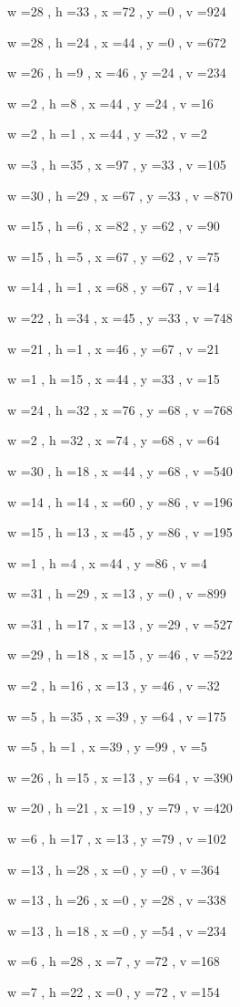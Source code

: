 \documentclass[11pt]{article}
\begin{document}
w =28 , h =33 , x =72 , y =0 , v =924
\par
w =28 , h =24 , x =44 , y =0 , v =672
\par
w =26 , h =9 , x =46 , y =24 , v =234
\par
w =2 , h =8 , x =44 , y =24 , v =16
\par
w =2 , h =1 , x =44 , y =32 , v =2
\par
w =3 , h =35 , x =97 , y =33 , v =105
\par
w =30 , h =29 , x =67 , y =33 , v =870
\par
w =15 , h =6 , x =82 , y =62 , v =90
\par
w =15 , h =5 , x =67 , y =62 , v =75
\par
w =14 , h =1 , x =68 , y =67 , v =14
\par
w =22 , h =34 , x =45 , y =33 , v =748
\par
w =21 , h =1 , x =46 , y =67 , v =21
\par
w =1 , h =15 , x =44 , y =33 , v =15
\par
w =24 , h =32 , x =76 , y =68 , v =768
\par
w =2 , h =32 , x =74 , y =68 , v =64
\par
w =30 , h =18 , x =44 , y =68 , v =540
\par
w =14 , h =14 , x =60 , y =86 , v =196
\par
w =15 , h =13 , x =45 , y =86 , v =195
\par
w =1 , h =4 , x =44 , y =86 , v =4
\par
w =31 , h =29 , x =13 , y =0 , v =899
\par
w =31 , h =17 , x =13 , y =29 , v =527
\par
w =29 , h =18 , x =15 , y =46 , v =522
\par
w =2 , h =16 , x =13 , y =46 , v =32
\par
w =5 , h =35 , x =39 , y =64 , v =175
\par
w =5 , h =1 , x =39 , y =99 , v =5
\par
w =26 , h =15 , x =13 , y =64 , v =390
\par
w =20 , h =21 , x =19 , y =79 , v =420
\par
w =6 , h =17 , x =13 , y =79 , v =102
\par
w =13 , h =28 , x =0 , y =0 , v =364
\par
w =13 , h =26 , x =0 , y =28 , v =338
\par
w =13 , h =18 , x =0 , y =54 , v =234
\par
w =6 , h =28 , x =7 , y =72 , v =168
\par
w =7 , h =22 , x =0 , y =72 , v =154
\par
\newpage
\end{document}
